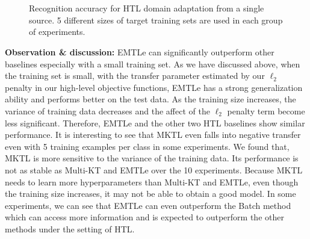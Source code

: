 \begin{figure}[th]
\centering
{}
\\
\\
\caption{Recognition accuracy for HTL domain adaptation from a single source. 5 different sizes of target training sets are used in each group of experiments.}
\label{fig:exp}
\end{figure}

\textbf{Observation \& discussion:} EMTLe can significantly outperform other baselines especially with a small training set. %
As we have discussed above, when the training set is small, with the transfer parameter estimated by our $\ell_2$ penalty in our high-level objective functions, EMTLe has a strong generalization ability and performs better on the test data. As the training size increases, the variance of training data decreases and the affect of the $\ell_2$ penalty term become less significant. Therefore, EMTLe and the other two HTL baselines show similar performance. 
It is interesting to see that MKTL even falls into negative transfer even with 5 training examples per class in some experiments. We found that, MKTL is more sensitive to the variance of the training data. Its performance is not as stable as Multi-KT and EMTLe over the 10 experiments. Because MKTL needs to learn more hyperparameters than Multi-KT and EMTLe, even though the training size increases, it may not be able to obtain a good model. 
In some experiments, we can see that EMTLe can even outperform the Batch method which can access more information and is expected to outperform the other methods under the setting of HTL.